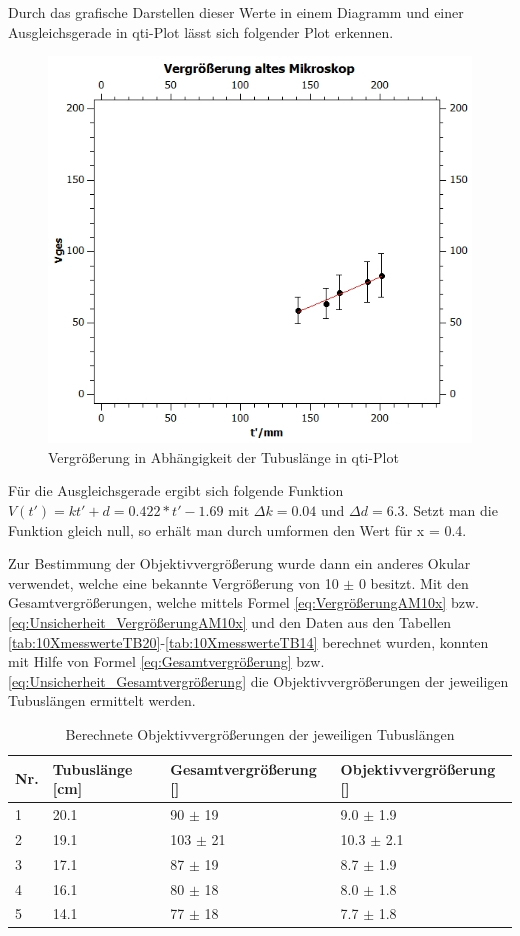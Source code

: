 \documentclass[12pt,a4paper,twoside]{article}
\begin{document}
\noindent
Durch das grafische Darstellen dieser Werte in einem Diagramm und einer Ausgleichsgerade in qti-Plot lässt sich folgender Plot erkennen.

\begin{figure}[H]
    \centering
    \includegraphics[width=0.6\linewidth, angle=0]{nudes/VergrößerungAltesMik.jpg}
    \caption{Vergrößerung in Abhängigkeit der Tubuslänge in qti-Plot}
    \label{fig:VergrößerungDiagramm}
\end{figure}

\noindent
Für die Ausgleichsgerade ergibt sich folgende Funktion $V(t') = kt' + d = 0.422*t' - 1.69$ mit $\Delta k = 0.04$ und $\Delta d = 6.3$. Setzt man die Funktion gleich null, so erhält man durch umformen den Wert für x = 0.4. \newline

\noindent 
Zur Bestimmung der Objektivvergrößerung wurde dann ein anderes Okular verwendet, welche eine bekannte Vergrößerung von 10 $\pm$ 0 besitzt. 
Mit den Gesamtvergrößerungen, welche mittels Formel \ref{eq:VergrößerungAM10x} bzw. \ref{eq:Unsicherheit_VergrößerungAM10x} und den Daten aus den Tabellen \ref{tab:10XmesswerteTB20}-\ref{tab:10XmesswerteTB14} berechnet wurden, konnten mit Hilfe von Formel \ref*{eq:Gesamtvergrößerung} bzw. \ref{eq:Unsicherheit_Gesamtvergrößerung} die Objektivvergrößerungen der jeweiligen Tubuslängen ermittelt werden.

\begin{table}[H]
    \centering
    \caption{Berechnete Objektivvergrößerungen der jeweiligen Tubuslängen}
    \label{tab:Objektivvergrößerungen}
    \begin{tabular}{| l | l | l | l |}
        \hline
        Nr.   & Tubuslänge [cm]  & Gesamtvergrößerung [] & Objektivvergrößerung [] \\
        \hline
        1 & 20.1 & 90 $\pm$ 19 & 9.0 $\pm$ 1.9 \\
        2 & 19.1 & 103 $\pm$ 21 & 10.3 $\pm$ 2.1 \\
        3 & 17.1 & 87 $\pm$ 19 & 8.7 $\pm$ 1.9 \\
        4 & 16.1 & 80 $\pm$ 18 & 8.0 $\pm$ 1.8 \\
        5 & 14.1 & 77 $\pm$ 18 & 7.7 $\pm$ 1.8 \\
        \hline
    \end{tabular}
\end{table}
\end{document}
